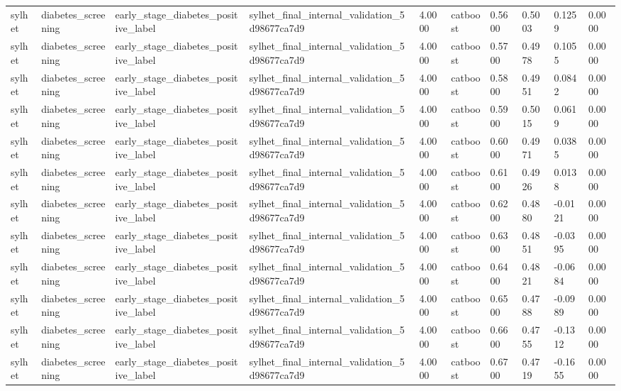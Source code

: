 \begin{tabular}{llllllllll}
sylhet & diabetes\_screening & early\_stage\_diabetes\_positive\_label & sylhet\_final\_internal\_validation\_5d98677ca7d9 & 4.0000 & catboost & 0.5600 & 0.5003 & 0.1259 & 0.0000 \\
sylhet & diabetes\_screening & early\_stage\_diabetes\_positive\_label & sylhet\_final\_internal\_validation\_5d98677ca7d9 & 4.0000 & catboost & 0.5700 & 0.4978 & 0.1055 & 0.0000 \\
sylhet & diabetes\_screening & early\_stage\_diabetes\_positive\_label & sylhet\_final\_internal\_validation\_5d98677ca7d9 & 4.0000 & catboost & 0.5800 & 0.4951 & 0.0842 & 0.0000 \\
sylhet & diabetes\_screening & early\_stage\_diabetes\_positive\_label & sylhet\_final\_internal\_validation\_5d98677ca7d9 & 4.0000 & catboost & 0.5900 & 0.5015 & 0.0619 & 0.0000 \\
sylhet & diabetes\_screening & early\_stage\_diabetes\_positive\_label & sylhet\_final\_internal\_validation\_5d98677ca7d9 & 4.0000 & catboost & 0.6000 & 0.4971 & 0.0385 & 0.0000 \\
sylhet & diabetes\_screening & early\_stage\_diabetes\_positive\_label & sylhet\_final\_internal\_validation\_5d98677ca7d9 & 4.0000 & catboost & 0.6100 & 0.4926 & 0.0138 & 0.0000 \\
sylhet & diabetes\_screening & early\_stage\_diabetes\_positive\_label & sylhet\_final\_internal\_validation\_5d98677ca7d9 & 4.0000 & catboost & 0.6200 & 0.4880 & -0.0121 & 0.0000 \\
sylhet & diabetes\_screening & early\_stage\_diabetes\_positive\_label & sylhet\_final\_internal\_validation\_5d98677ca7d9 & 4.0000 & catboost & 0.6300 & 0.4851 & -0.0395 & 0.0000 \\
sylhet & diabetes\_screening & early\_stage\_diabetes\_positive\_label & sylhet\_final\_internal\_validation\_5d98677ca7d9 & 4.0000 & catboost & 0.6400 & 0.4821 & -0.0684 & 0.0000 \\
sylhet & diabetes\_screening & early\_stage\_diabetes\_positive\_label & sylhet\_final\_internal\_validation\_5d98677ca7d9 & 4.0000 & catboost & 0.6500 & 0.4788 & -0.0989 & 0.0000 \\
sylhet & diabetes\_screening & early\_stage\_diabetes\_positive\_label & sylhet\_final\_internal\_validation\_5d98677ca7d9 & 4.0000 & catboost & 0.6600 & 0.4755 & -0.1312 & 0.0000 \\
sylhet & diabetes\_screening & early\_stage\_diabetes\_positive\_label & sylhet\_final\_internal\_validation\_5d98677ca7d9 & 4.0000 & catboost & 0.6700 & 0.4719 & -0.1655 & 0.0000 \\

\end{tabular}
